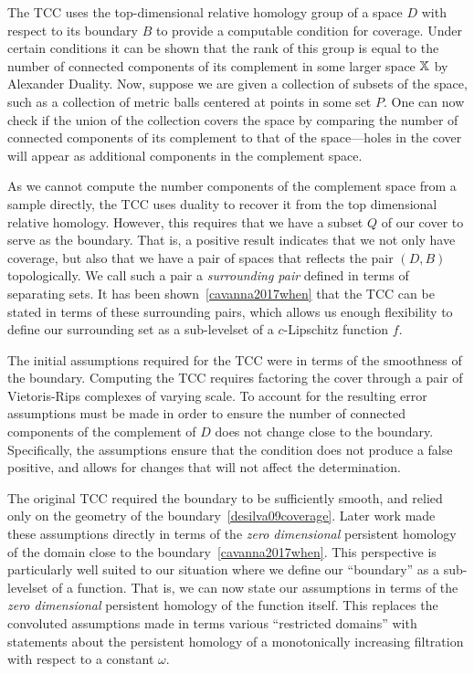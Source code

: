 The TCC uses the top-dimensional relative homology group of a space $D$ with respect to its boundary $B$ to provide a computable condition for coverage.
Under certain conditions it can be shown that the rank of this group is equal to the number of connected components of its complement in some larger space $\mathbb{X}$ by Alexander Duality.
Now, suppose we are given a collection of subsets of the space, such as a collection of metric balls centered at points in some set $P$.
One can now check if the union of the collection covers the space by comparing the number of connected components of its complement to that of the space---holes in the cover will appear as additional components in the complement space.

As we cannot compute the number components of the complement space from a sample directly, the TCC uses duality to recover it from the top dimensional relative homology.
However, this requires that we have a subset $Q$ of our cover to serve as the boundary.
That is, a positive result indicates that we not only have coverage, but also that we have a pair of spaces that reflects the pair $(D, B)$ topologically.
We call such a pair a \emph{surrounding pair} defined in terms of separating sets.
It has been shown~\ref{cavanna2017when} that the TCC can be stated in terms of these surrounding pairs, which allows us enough flexibility to define our surrounding set as a sub-levelset of a $c$-Lipschitz function $f$.

The initial assumptions required for the TCC were in terms of the smoothness of the boundary.
Computing the TCC requires factoring the cover through a pair of Vietoris-Rips complexes of varying scale.
To account for the resulting error assumptions must be made in order to ensure the number of connected components of the complement of $D$ does not change close to the boundary.
Specifically, the assumptions ensure that the condition does not produce a false positive, and allows for changes that will not affect the determination.

The original TCC required the boundary to be sufficiently smooth, and relied only on the geometry of the boundary~\ref{desilva09coverage}.
Later work made these assumptions directly in terms of the \emph{zero dimensional} persistent homology of the domain close to the boundary~\ref{cavanna2017when}.
This perspective is particularly well suited to our situation where we define our ``boundary'' as a sub-levelset of a function.
That is, we can now state our assumptions in terms of the \emph{zero dimensional} persistent homology of the function itself.
This replaces the convoluted assumptions made in terms various ``restricted domains'' with statements about the persistent homology of a monotonically increasing filtration with respect to a constant $\omega$.

